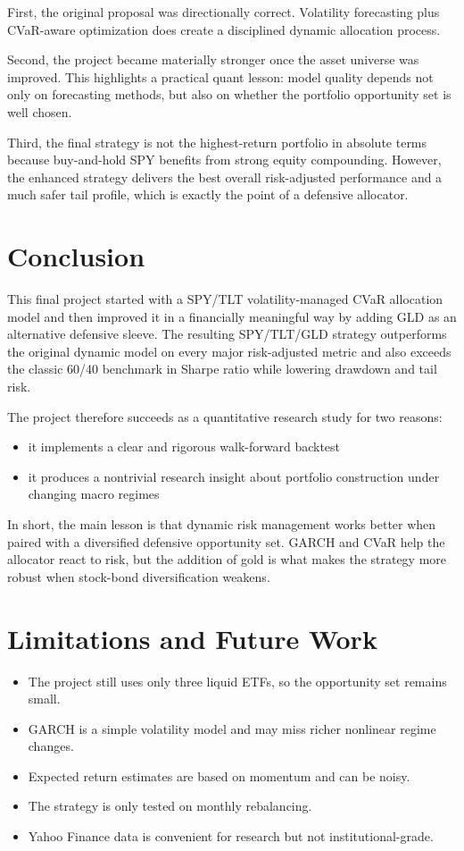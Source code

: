 \documentclass[11pt]{article}
\begin{document}
First, the original proposal was directionally correct. Volatility forecasting plus CVaR-aware optimization does create a disciplined dynamic allocation process.

Second, the project became materially stronger once the asset universe was improved. This highlights a practical quant lesson: model quality depends not only on forecasting methods, but also on whether the portfolio opportunity set is well chosen.

Third, the final strategy is not the highest-return portfolio in absolute terms because buy-and-hold SPY benefits from strong equity compounding. However, the enhanced strategy delivers the best overall risk-adjusted performance and a much safer tail profile, which is exactly the point of a defensive allocator.

\section{Conclusion}
This final project started with a SPY/TLT volatility-managed CVaR allocation model and then improved it in a financially meaningful way by adding GLD as an alternative defensive sleeve. The resulting SPY/TLT/GLD strategy outperforms the original dynamic model on every major risk-adjusted metric and also exceeds the classic 60/40 benchmark in Sharpe ratio while lowering drawdown and tail risk.

The project therefore succeeds as a quantitative research study for two reasons:
\begin{itemize}
    \item it implements a clear and rigorous walk-forward backtest
    \item it produces a nontrivial research insight about portfolio construction under changing macro regimes
\end{itemize}

In short, the main lesson is that dynamic risk management works better when paired with a diversified defensive opportunity set. GARCH and CVaR help the allocator react to risk, but the addition of gold is what makes the strategy more robust when stock-bond diversification weakens.

\section{Limitations and Future Work}
\begin{itemize}
    \item The project still uses only three liquid ETFs, so the opportunity set remains small.
    \item GARCH is a simple volatility model and may miss richer nonlinear regime changes.
    \item Expected return estimates are based on momentum and can be noisy.
    \item The strategy is only tested on monthly rebalancing.
    \item Yahoo Finance data is convenient for research but not institutional-grade.
\end{itemize}
\end{document}
